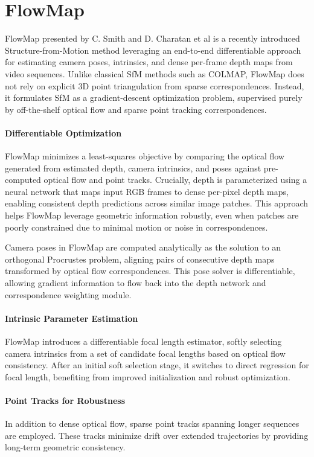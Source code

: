 \section{FlowMap}\label{sec:flowmap}


FlowMap \cite{smith24flowmap} presented by C. Smith and D. Charatan et al is a recently introduced Structure-from-Motion method leveraging an end-to-end differentiable approach for estimating camera poses, intrinsics, and dense per-frame depth maps from video sequences. 
Unlike classical SfM methods such as COLMAP, FlowMap does not rely on explicit 3D point triangulation from sparse correspondences. 
Instead, it formulates SfM as a gradient-descent optimization problem, supervised purely by off-the-shelf optical flow and sparse point tracking correspondences.

\paragraph{Differentiable Optimization}
FlowMap minimizes a least-squares objective by comparing the optical flow generated from estimated depth, camera intrinsics, and poses against pre-computed optical flow and point tracks. 
Crucially, depth is parameterized using a neural network that maps input RGB frames to dense per-pixel depth maps, enabling consistent depth predictions across similar image patches. 
This approach helps FlowMap leverage geometric information robustly, even when patches are poorly constrained due to minimal motion or noise in correspondences.

Camera poses in FlowMap are computed analytically as the solution to an orthogonal Procrustes problem, aligning pairs of consecutive depth maps transformed by optical flow correspondences. 
This pose solver is differentiable, allowing gradient information to flow back into the depth network and correspondence weighting module.

\paragraph{Intrinsic Parameter Estimation}
FlowMap introduces a differentiable focal length estimator, softly selecting camera intrinsics from a set of candidate focal lengths based on optical flow consistency. 
After an initial soft selection stage, it switches to direct regression for focal length, benefiting from improved initialization and robust optimization.

\paragraph{Point Tracks for Robustness}
In addition to dense optical flow, sparse point tracks spanning longer sequences are employed. 
These tracks minimize drift over extended trajectories by providing long-term geometric consistency.


